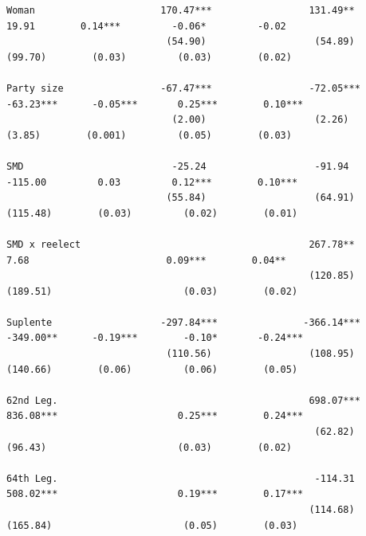 \documentclass[letter,12pt]{article}
\begin{document}
\begin{table}
\begin{tiny}
\begin{verbatim}
Woman                      170.47***                 131.49**              19.91        0.14***         -0.06*         -0.02    
                            (54.90)                   (54.89)             (99.70)        (0.03)         (0.03)        (0.02)    
                                                                                                                                
Party size                 -67.47***                 -72.05***           -63.23***      -0.05***       0.25***        0.10***   
                             (2.00)                   (2.26)              (3.85)        (0.001)         (0.05)        (0.03)    
                                                                                                                                
SMD                          -25.24                   -91.94              -115.00         0.03         0.12***        0.10***   
                            (55.84)                   (64.91)            (115.48)        (0.03)         (0.02)        (0.01)    
                                                                                                                                
SMD x reelect                                        267.78**              7.68                        0.09***        0.04**    
                                                     (120.85)            (189.51)                       (0.03)        (0.02)    
                                                                                                                                
Suplente                   -297.84***               -366.14***           -349.00**      -0.19***        -0.10*       -0.24***   
                            (110.56)                 (108.95)            (140.66)        (0.06)         (0.06)        (0.05)    
                                                                                                                                
62nd Leg.                                            698.07***           836.08***                     0.25***        0.24***   
                                                      (62.82)             (96.43)                       (0.03)        (0.02)    
                                                                                                                                
64th Leg.                                             -114.31            508.02***                     0.19***        0.17***   
                                                     (114.68)            (165.84)                       (0.05)        (0.03)    
                                                                                                                                

\end{verbatim}
\end{tiny}
\end{table}
\end{document}
